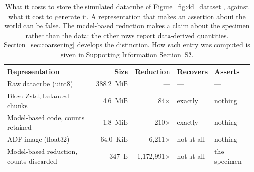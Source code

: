 \begin{table}[h]
\centering
\caption{What it costs to store the simulated datacube of Figure~\ref{fig:4d_dataset}, against what it cost to generate it. A representation that makes an assertion about the world can be false. The model-based reduction makes a claim about the specimen rather than the data; the other rows report data-derived quantities. Section~\ref{sec:coarsening} develops the distinction. How each entry was computed is given in Supporting Information Section~S2.}
\label{tab:generative}
\setlength{\tabcolsep}{4pt}
\begin{tabular}{lrrll}
\hline
Representation & Size & Reduction & Recovers & Asserts \\
\hline
Raw datacube (uint8) & 388.2~MiB & --- & --- & --- \\
Blosc Zstd, balanced chunks & 4.6~MiB & 84$\times$ & exactly & nothing \\
Model-based code, counts retained & 1.8~MiB & 210$\times$ & exactly & nothing \\
ADF image (float32) & 64.0~KiB & 6,211$\times$ & not at all & nothing \\
Model-based reduction, counts discarded & 347~B & 1,172,991$\times$ & not at all & the specimen \\
\hline
\end{tabular}
\end{table}
